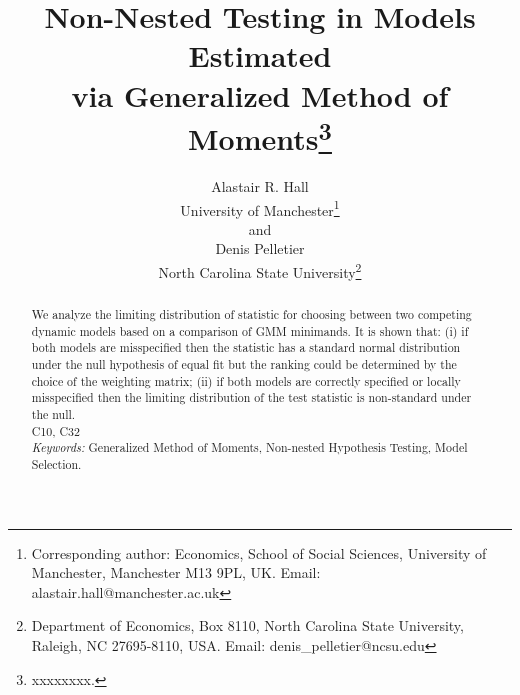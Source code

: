\documentclass[titlepage,11pt]{article}
\begin{document}
\title{Non-Nested Testing in Models Estimated\\via Generalized Method
  of Moments\thanks{xxxxxxxx.}}
\author{Alastair R. Hall\\University of Manchester\thanks{Corresponding author: Economics, School of Social Sciences, University of Manchester, Manchester M13 9PL, UK. Email:
    alastair.hall@manchester.ac.uk}\\and\\Denis Pelletier\\North Carolina
  State University\thanks{Department of Economics, Box 8110, North
    Carolina State University, Raleigh, NC 27695-8110, USA. Email:
    denis\_pelletier@ncsu.edu}}
\maketitle
\thispagestyle{empty}
\newpage
\begin{abstract}
We analyze the limiting distribution of  statistic for choosing between two competing dynamic models based on a comparison of GMM minimands. It is shown that: (i) if both models are misspecified then the statistic has a standard normal distribution under the null hypothesis of equal fit but the ranking could be determined by the choice of the weighting matrix; (ii) if both models are correctly specified or locally misspecified then the limiting distribution of the test statistic is non-standard under the null.\\[0.2in]

 C10, C32\\
{\it Keywords:} Generalized Method of Moments, Non-nested Hypothesis
Testing, Model Selection.
\end{abstract}
\end{document}
